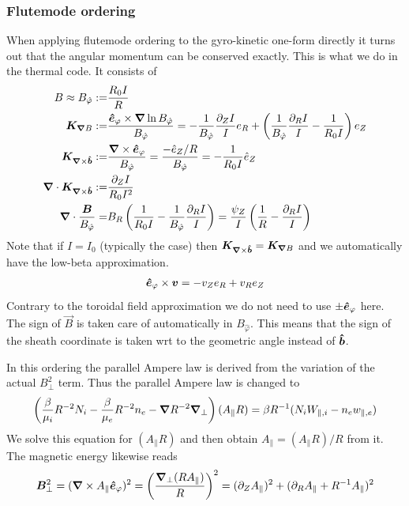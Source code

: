 \subsubsection{Flutemode ordering} \label{sec:flutemode}
When applying flutemode ordering to the gyro-kinetic one-form directly it turns
out that the angular momentum can be conserved exactly. This is what we do in the thermal code.
It consists of
\begin{align}
    B \approx B_{\hat \varphi}:=& \frac{R_0 I}{R}
    \\
    {{\boldsymbol{K}}_{{\boldsymbol{\nabla}} B}} :=& \frac{\bm{\hat{e}}_\varphi \times {\boldsymbol{\nabla}} \ln B_{\hat \varphi}}{B_{\hat \varphi}}= - \frac{1}{B_{\hat \varphi}}\frac{ \partial_Z I}{I} e_R + \left(\frac{1}{B_{\hat \varphi}}\frac{\partial_R I}{I} - \frac{1}{R_0 I}\right) e_Z
    \\
    {{\boldsymbol{K}}_{{\boldsymbol{\nabla}}\times\bm{\hat{b}}}} :=& \frac{{\boldsymbol{\nabla}} \times \bm{\hat{e}}_\varphi}{B_{\hat \varphi}} = \frac{-\hat e_Z/R}{B_{\hat \varphi}} = - \frac{1}{R_0 I} \hat e_Z
    \\
    {\boldsymbol{\nabla}}\cdot {{\boldsymbol{K}}_{{\boldsymbol{\nabla}}\times\bm{\hat{b}}}} :=& \frac{\partial_Z I}{R_0 I^2}
    \\
    {\boldsymbol{\nabla}}\cdot \frac{{\boldsymbol{B}}}{B_{\hat \varphi}} =& B_R\left(  \frac{1}{R_0 I} - \frac{1}{B_{\hat \varphi}}\frac{\partial_R I}{I}\right) = \frac{\psi_Z}{I} \left( \frac{1}{R} -  \frac{\partial_R I}{I} \right)
\end{align}
Note that if $I=I_0$ (typically the case) then ${{\boldsymbol{K}}_{{\boldsymbol{\nabla}}\times\bm{\hat{b}}}} = {{\boldsymbol{K}}_{{\boldsymbol{\nabla}} B}}$ and we automatically have the low-beta approximation.
\begin{align}
    \bm{\hat{e}}_\varphi \times {\boldsymbol{v}} = -v_Ze_R +v_Re_Z
\end{align}
Contrary to the toroidal field approximation we do not need to use $\pm \bm{\hat{e}}_\varphi$ here. The sign of $\vec B$ is taken care of automatically in $B_{\hat \varphi}$.
This means that the sign of the sheath coordinate is taken wrt to the geometric angle instead of $\bm{\hat{b}}$.

In this ordering the parallel Ampere law is derived from the variation of the actual $B_\perp^2$ term.
Thus the parallel Ampere law is changed to
\begin{align}
    \left(\frac{\beta}{\mu_i}R^{-2}N_i - \frac{\beta}{\mu_e} R^{-2}n_e - {\boldsymbol{\nabla}} R^{-2} {\boldsymbol{\nabla}}_{\perp} \right) (A_\parallel R)= \beta R^{-1}(N_i W_{\parallel,i} - n_e w_{\parallel,e})
\end{align}
We solve this equation for $(A_\parallel R)$ and then obtain $A_\parallel = (A_\parallel R)/R$ from it.
The magnetic energy likewise reads
\begin{align}
{\boldsymbol{B}}_\perp^2 = ({\boldsymbol{\nabla}} \times A_\parallel \bm{\hat{e}}_\varphi)^2 = \left( \frac{{\boldsymbol{\nabla}}_{\perp} (R A_\parallel)}{R}\right)^2 = (\partial_Z A_\parallel)^2 + ( \partial_R A_\parallel + R^{-1} A_\parallel)^2
\end{align}
